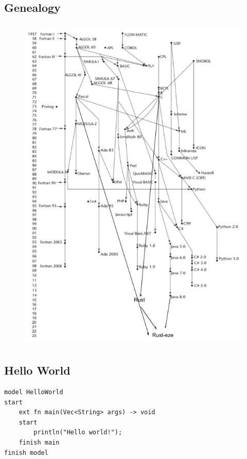 \documentclass[letterpaper, 10pt, DIV=13]{scrartcl}
\numberwithin{equation}{section}
\numberwithin{figure}{section}
\numberwithin{table}{section}
\begin{document}
\subsection{Genealogy}
\begin{figure}[ht]
    \centering
    \includegraphics[height=6.5in]{genealogy}
\end{figure}

\newpage

\subsection{Hello World}
\begin{lstlisting}[caption = HelloWorld.rez, frame = single, nolol]
model HelloWorld
start
    ext fn main(Vec<String> args) -> void
    start
        println("Hello world!");
    finish main
finish model
\end{lstlisting}
\end{document}
